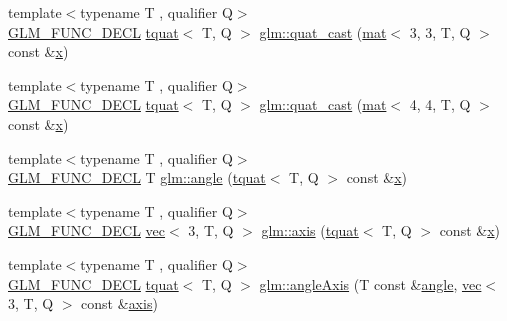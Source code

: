 \begin{DoxyCompactItemize}
\item 
{\footnotesize template$<$typename T , qualifier Q$>$ }\\\mbox{\hyperlink{setup_8hpp_ab2d052de21a70539923e9bcbf6e83a51}{G\+L\+M\+\_\+\+F\+U\+N\+C\+\_\+\+D\+E\+CL}} \mbox{\hyperlink{structglm_1_1tquat}{tquat}}$<$ T, Q $>$ \mbox{\hyperlink{group__gtc__quaternion_ga03e023aec9acd561a28594bbc8a3abf6}{glm\+::quat\+\_\+cast}} (\mbox{\hyperlink{structglm_1_1mat}{mat}}$<$ 3, 3, T, Q $>$ const \&\mbox{\hyperlink{_s_d_l__opengl_8h_ad0e63d0edcdbd3d79554076bf309fd47}{x}})
\item 
{\footnotesize template$<$typename T , qualifier Q$>$ }\\\mbox{\hyperlink{setup_8hpp_ab2d052de21a70539923e9bcbf6e83a51}{G\+L\+M\+\_\+\+F\+U\+N\+C\+\_\+\+D\+E\+CL}} \mbox{\hyperlink{structglm_1_1tquat}{tquat}}$<$ T, Q $>$ \mbox{\hyperlink{group__gtc__quaternion_ga50bb9aecf42fdab04e16039ab6a81c60}{glm\+::quat\+\_\+cast}} (\mbox{\hyperlink{structglm_1_1mat}{mat}}$<$ 4, 4, T, Q $>$ const \&\mbox{\hyperlink{_s_d_l__opengl_8h_ad0e63d0edcdbd3d79554076bf309fd47}{x}})
\item 
{\footnotesize template$<$typename T , qualifier Q$>$ }\\\mbox{\hyperlink{setup_8hpp_ab2d052de21a70539923e9bcbf6e83a51}{G\+L\+M\+\_\+\+F\+U\+N\+C\+\_\+\+D\+E\+CL}} T \mbox{\hyperlink{group__gtc__quaternion_gaaee6c856cae3217d274a240238cb6373}{glm\+::angle}} (\mbox{\hyperlink{structglm_1_1tquat}{tquat}}$<$ T, Q $>$ const \&\mbox{\hyperlink{_s_d_l__opengl_8h_ad0e63d0edcdbd3d79554076bf309fd47}{x}})
\item 
{\footnotesize template$<$typename T , qualifier Q$>$ }\\\mbox{\hyperlink{setup_8hpp_ab2d052de21a70539923e9bcbf6e83a51}{G\+L\+M\+\_\+\+F\+U\+N\+C\+\_\+\+D\+E\+CL}} \mbox{\hyperlink{structglm_1_1vec}{vec}}$<$ 3, T, Q $>$ \mbox{\hyperlink{group__gtc__quaternion_gaaf2707d3081789ce097daaa6e54d5287}{glm\+::axis}} (\mbox{\hyperlink{structglm_1_1tquat}{tquat}}$<$ T, Q $>$ const \&\mbox{\hyperlink{_s_d_l__opengl_8h_ad0e63d0edcdbd3d79554076bf309fd47}{x}})
\item 
{\footnotesize template$<$typename T , qualifier Q$>$ }\\\mbox{\hyperlink{setup_8hpp_ab2d052de21a70539923e9bcbf6e83a51}{G\+L\+M\+\_\+\+F\+U\+N\+C\+\_\+\+D\+E\+CL}} \mbox{\hyperlink{structglm_1_1tquat}{tquat}}$<$ T, Q $>$ \mbox{\hyperlink{group__gtc__quaternion_ga93856b8bfcdd5b9a164248df3149476c}{glm\+::angle\+Axis}} (T const \&\mbox{\hyperlink{_s_d_l__opengl__glext_8h_a9e06c1f76a20fed54ca742cd25cb02c4}{angle}}, \mbox{\hyperlink{structglm_1_1vec}{vec}}$<$ 3, T, Q $>$ const \&\mbox{\hyperlink{group__gtc__quaternion_gaaf2707d3081789ce097daaa6e54d5287}{axis}})

\end{DoxyCompactItemize}
